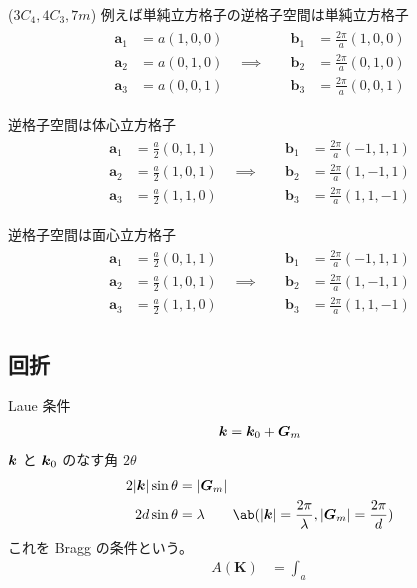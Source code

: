 \documentclass[uplatex,dvipdfmx,a4paper,11pt]{jlreq}
\renewcommand{\aa}{\bm{a}}
\newcommand{\bb}{\bm{b}}
\newcommand{\KK}{\bm{K}}
\begin{document}
\begin{example}
  ($3C_4, 4C_3, 7m$)
  例えば単純立方格子の逆格子空間は単純立方格子
  \begin{align}
    \begin{alignedat}{3}
      \aa_1 & = a(1, 0, 0) & \bb_1 & = \frac{2\pi}{a}(1, 0, 0) \\
      \aa_2 & = a(0, 1, 0) \quad\implies\quad & \bb_2 & = \frac{2\pi}{a}(0, 1, 0) \\
      \aa_3 & = a(0, 0, 1) & \bb_3 & = \frac{2\pi}{a}(0, 0, 1)
    \end{alignedat}
  \end{align}
\end{example}
\begin{example}[面心立方格子]
  逆格子空間は体心立方格子
  \begin{align}
    \begin{alignedat}{3}
      \aa_1 & = \frac{a}{2}(0, 1, 1) & \bb_1 & = \frac{2\pi}{a}(-1, 1, 1) \\
      \aa_2 & = \frac{a}{2}(1, 0, 1) \quad\implies\quad & \bb_2 & = \frac{2\pi}{a}(1, -1, 1) \\
      \aa_3 & = \frac{a}{2}(1, 1, 0) & \bb_3 & = \frac{2\pi}{a}(1, 1, -1)
    \end{alignedat}
  \end{align}
\end{example}
\begin{example}[体心立方格子]
  逆格子空間は面心立方格子
  \begin{align}
    \begin{alignedat}{3}
      \aa_1 & = \frac{a}{2}(0, 1, 1) & \bb_1 & = \frac{2\pi}{a}(-1, 1, 1) \\
      \aa_2 & = \frac{a}{2}(1, 0, 1) \quad\implies\quad & \bb_2 & = \frac{2\pi}{a}(1, -1, 1) \\
      \aa_3 & = \frac{a}{2}(1, 1, 0) & \bb_3 & = \frac{2\pi}{a}(1, 1, -1)
    \end{alignedat}
  \end{align}
\end{example}

\subsection{回折}
Laue 条件
\begin{align}
  \bm{k} = \bm{k}_0 + \bm{G}_m
\end{align}
$\bm{k}$ と $\bm{k}_0$ のなす角 $2\theta$
\begin{align}
  2|\kk|\sin\theta & = |\bm{G}_m|                                                                    \\
  2d\sin\theta     & = \lambda \qquad \ab(|\kk| = \frac{2\pi}{\lambda}, |\bm{G}_m| = \frac{2\pi}{d})
\end{align}
これを Bragg の条件という。
\begin{align}
  A(\KK) & = \int_a
\end{align}
\end{document}
